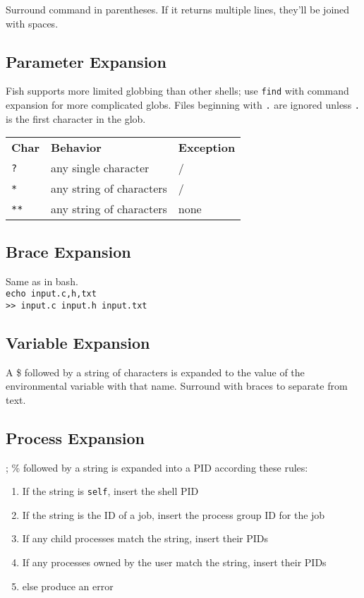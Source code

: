 \documentclass[10pt]{extarticle}
\begin{document}
\begin{paracol}{2}
Surround command in parentheses.
If it returns multiple lines, they'll be joined with spaces.

\subsection*{Parameter Expansion}

Fish supports more limited globbing than other shells; use \texttt{find} with command expansion for more complicated globs.
Files beginning with \texttt{.} are ignored unless \texttt{.} is the first character in the glob.

\begin{tabularx}{\columnwidth}{X X X}
    \rowcolor{DarkBackground}
    \textbf{Char} & \textbf{Behavior} & \textbf{Exception} \\
    \texttt{?} & any single character & / \\
    \texttt{*} & any string of characters & / \\
    \texttt{**} & any string of characters & none
\end{tabularx}

\subsection*{Brace Expansion}

Same as in bash.\\
\texttt{echo input.{c,h,txt}}\\
\texttt{>> input.c input.h input.txt}

\subsection*{Variable Expansion}

A \$ followed by a string of characters is expanded to the value of the environmental variable with that name.
Surround with braces to separate from text.

\subsection*{Process Expansion}

;
\% followed by a string is expanded into a PID according these rules:

\begin{enumerate}
    \item If the string is \texttt{self}, insert the shell PID
    \item If the string is the ID of a job, insert the process group ID for
        the job
    \item If any child processes match the string, insert their PIDs
    \item If any processes owned by the user match the string, insert their PIDs
    \item else produce an error
\end{enumerate}


\end{paracol}
\end{document}
